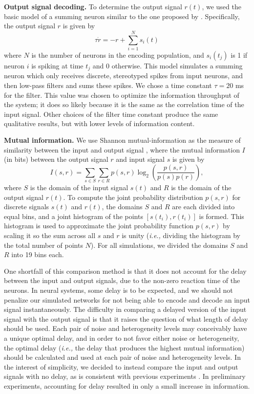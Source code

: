 \documentclass[letterpaper,11pt]{article}
\begin{document}
\textbf{Output signal decoding.} To determine the output signal $r(t)$, we used the basic model of a summing neuron similar to the one proposed by \cite{Stocks2001}. Specifically, the output signal $r$ is given by
\begin{equation}
  \tau \dot{r} = -r + \sum\limits_{i=1}^N s_i(t)
\end{equation}
where $N$ is the number of neurons in the encoding population, and $s_i(t_j)$ is 1 if neuron $i$ is spiking at time $t_j$ and 0 otherwise. This model simulates a summing neuron which only receives discrete, stereotyped spikes from input neurons, and then low-pass filters and sums these spikes.
We chose a time constant $\tau = 20$ ms for the filter. This value was chosen to optimize the information throughput of the system; it does so likely because it is the same as the correlation time of the input signal. Other choices of the filter time constant produce the same qualitative results, but with lower levels of information content.


\textbf{Mutual information.} We use Shannon mutual-information as the measure of similarity between the input and output signal \citep{Heneghan1996,Stocks2001}, where the mutual information $I$ (in bits) between the output signal $r$ and input signal $s$ is given by
\begin{equation}
  I(s,r) = \sum\limits_{s \in S} \sum\limits_{r \in R} p(s,r) \log_2\left(\frac{p(s,r)}{p(s)p(r)}\right),
\end{equation}
where $S$ is the domain of the input signal $s(t)$ and $R$ is the domain of the output signal $r(t)$. To compute the joint probability distribution $p(s,r)$ for discrete signals $s(t)$ and $r(t)$, the domains $S$ and $R$ are each divided into equal bins, and a joint histogram of the points $[s(t_i),r(t_i)]$ is formed. This histogram is used to approximate the joint probability function $p(s,r)$ by scaling it so the sum across all $s$ and $r$ is unity (\emph{i.e.,} dividing the histogram by the total number of points $N$). For all simulations, we divided the domains $S$ and $R$ into 19 bins each.

One shortfall of this comparison method is that it does not account for the delay between the input and output signals, due to the non-zero reaction time of the neurons. In neural systems, some delay is to be expected, and we should not penalize our simulated networks for not being able to encode and decode an input signal instantaneously. The difficulty in comparing a delayed version of the input signal with the output signal is that it raises the question of what length of delay should be used. Each pair of noise and heterogeneity levels may conceivably have a unique optimal delay, and in order to not favor either noise or heterogeneity, the optimal delay (\emph{i.e.,} the delay that produces the highest mutual information) should be calculated and used at each pair of noise and heterogeneity levels. In the interest of simplicity, we decided to instead compare the input and output signals with no delay, as is consistent with previous experiments \citep{Stocks2001}. In preliminary experiments, accounting for delay resulted in only a small increase in information.
\end{document}
